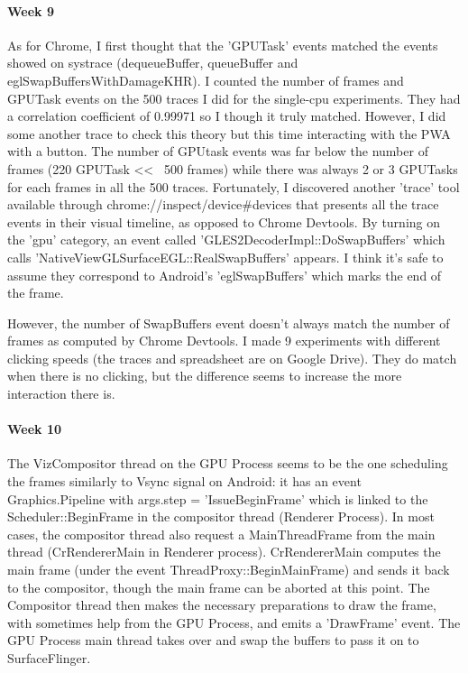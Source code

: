 \documentclass{kththesis}
\begin{document}
\paragraph{Week 9}
As for Chrome, I first thought that the 'GPUTask' events matched the events showed on systrace (dequeueBuffer, queueBuffer and eglSwapBuffersWithDamageKHR). I counted the number of frames and GPUTask events on the 500 traces I did for the single-cpu experiments. They had a correlation coefficient of 0.99971 so I though it truly matched.
However, I did some another trace to check this theory but this time interacting with the PWA with a button. The number of GPUtask events was far below the number of frames (220 GPUTask << ~500 frames) while there was always 2 or 3 GPUTasks for each frames in all the 500 traces.
Fortunately, I discovered another 'trace' tool available through chrome://inspect/device{\#}devices that presents all the trace events in their visual timeline, as opposed to Chrome Devtools. By turning on the 'gpu' category, an event called 'GLES2DecoderImpl::DoSwapBuffers' which calls 'NativeViewGLSurfaceEGL::RealSwapBuffers' appears. I think it's safe to assume they correspond to Android's 'eglSwapBuffers' which marks the end of the frame.

However, the number of SwapBuffers event doesn't always match the number of frames as computed by Chrome Devtools. I made 9 experiments with different clicking speeds (the traces and spreadsheet are on Google Drive). They do match when there is no clicking, but the difference seems to increase the more interaction there is.

\paragraph{Week 10}
The VizCompositor thread on the GPU Process seems to be the one scheduling the frames similarly to Vsync signal on Android: it has an event Graphics.Pipeline with args.step = 'IssueBeginFrame' which is linked to the Scheduler::BeginFrame in the compositor thread (Renderer Process). In most cases, the compositor thread also request a MainThreadFrame from the main thread (CrRendererMain in Renderer process). CrRendererMain computes the main frame (under the event ThreadProxy::BeginMainFrame) and sends it back to the compositor, though the main frame can be aborted at this point. The Compositor thread then makes the necessary preparations to draw the frame, with sometimes help from the GPU Process, and emits a 'DrawFrame' event. The GPU Process main thread takes over and swap the buffers to pass it on to SurfaceFlinger.
\end{document}
